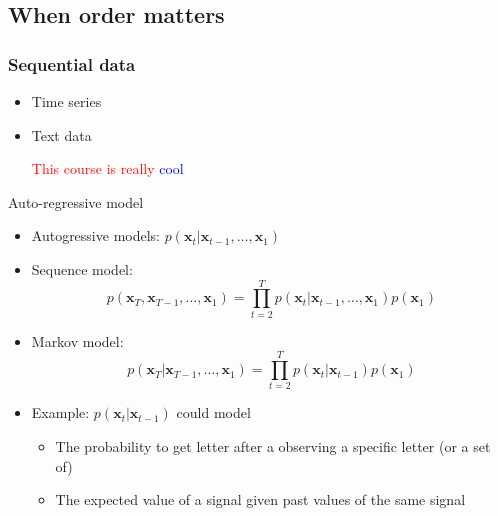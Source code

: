 \documentclass[pressentation,10pt,aspectratio=169,xcolor=table, colorlinks=true]{beamer}
\begin{document}
\subsection{When order matters}
\begin{frame}
  \frametitle{Sequential data}

  \begin{itemize}
  \item Time series
    \begin{center}
    \end{center}
  \item Text data
    \begin{center}
      \Large
      \textcolor{red}{This course is really} \textcolor{blue}{cool}
    \end{center}
  \end{itemize}
\end{frame}


\begin{frame}{Auto-regressive model}
  \begin{itemize}
  \item Autogressive models: \(p(\mathbf{x}_t | \mathbf{x}_{t-1}, \ldots, \mathbf{x}_1)\)
  \item Sequence model:
    \[p(\mathbf{x}_T , \mathbf{x}_{T-1}, \ldots, \mathbf{x}_1) = \prod_{t=2}^{T}p(\mathbf{x}_t | \mathbf{x}_{t-1}, \ldots, \mathbf{x}_1)p(\mathbf{x}_1) \]
  \item Markov model:
    \[p(\mathbf{x}_T | \mathbf{x}_{T-1}, \ldots, \mathbf{x}_1) = \prod_{t=2}^{T}p(\mathbf{x}_t |\mathbf{x}_{t-1}) p(\mathbf{x}_1)\]
  \item <2> Example: \(p(\mathbf{x}_t |\mathbf{x}_{t-1})\) could model
    \begin{itemize}
    \item The probability to get letter after a observing a specific letter (or a set of)
    \item The expected value of a signal given past values of the same signal
    \end{itemize}
    
  \end{itemize}
  
\end{frame}
\end{document}
